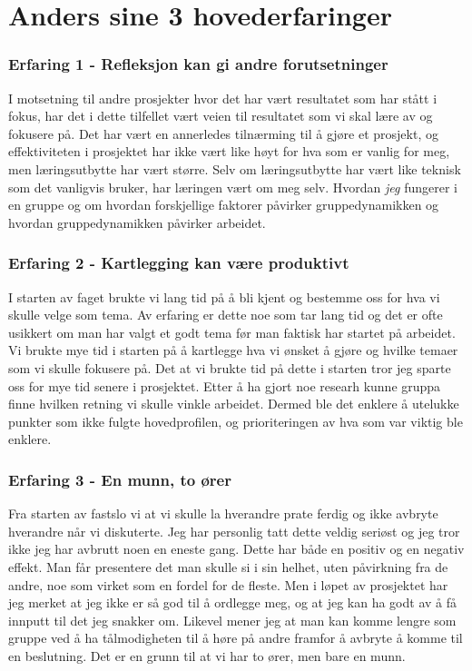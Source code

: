 \section{Anders sine 3 hovederfaringer}

\subsubsection*{Erfaring 1 - Refleksjon kan gi andre forutsetninger}

I motsetning til andre prosjekter hvor det har vært resultatet som har stått i fokus, har det i dette tilfellet vært veien til resultatet som vi skal lære av og fokusere på. Det har vært en annerledes tilnærming til å gjøre et prosjekt, og effektiviteten i prosjektet har ikke vært like høyt for hva som er vanlig for meg, men læringsutbytte har vært større. Selv om læringsutbytte har vært like teknisk som det vanligvis bruker, har læringen vært om meg selv. Hvordan \textit{jeg} fungerer i en gruppe og om hvordan forskjellige faktorer påvirker gruppedynamikken og hvordan gruppedynamikken påvirker arbeidet.

\subsubsection*{Erfaring 2 - Kartlegging kan være produktivt}

I starten av faget brukte vi lang tid på å bli kjent og bestemme oss for hva vi skulle velge som tema. Av erfaring er dette noe som tar lang tid og det er ofte usikkert om man har valgt et godt tema før man faktisk har startet på arbeidet. Vi brukte mye tid i starten på å kartlegge hva vi ønsket å gjøre og hvilke temaer som vi skulle fokusere på. Det at vi brukte tid på dette i starten tror jeg sparte oss for mye tid senere i prosjektet. Etter å ha gjort noe researh kunne gruppa finne hvilken retning vi skulle vinkle arbeidet. Dermed ble det enklere å utelukke punkter som ikke fulgte hovedprofilen, og prioriteringen av hva som var viktig ble enklere. 

\subsubsection*{Erfaring 3 - En munn, to ører}

Fra starten av fastslo vi at vi skulle la hverandre prate ferdig og ikke avbryte hverandre når vi diskuterte. Jeg har personlig tatt dette veldig seriøst og jeg tror ikke jeg har avbrutt noen en eneste gang. Dette har både en positiv og en negativ effekt. Man får presentere det man skulle si i sin helhet, uten påvirkning fra de andre, noe som virket som en fordel for de fleste. Men i løpet av prosjektet har jeg merket at jeg ikke er så god til å ordlegge meg, og at jeg kan ha godt av å få innputt til det jeg snakker om. Likevel mener jeg at man kan komme lengre som gruppe ved å ha tålmodigheten til å høre på andre framfor å avbryte å komme til en beslutning. Det er en grunn til at vi har to ører, men bare en munn.

